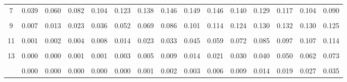\documentclass[
]{article}
\begin{document}
\begin{table}[!h]
{\begin{tabular}[t]{ccccccccccccccc}
7 & 0.039 & 0.060 & 0.082 & 0.104 & 0.123 & 0.138 & 0.146 & 0.149 & 0.146 & 0.140 & 0.129 & 0.117 & 0.104 & 0.090\\
\cellcolor{gray!10}{8} & \cellcolor{gray!10}{0.017} & \cellcolor{gray!10}{0.030} & \cellcolor{gray!10}{0.046} & \cellcolor{gray!10}{0.065} & \cellcolor{gray!10}{0.085} & \cellcolor{gray!10}{0.103} & \cellcolor{gray!10}{0.119} & \cellcolor{gray!10}{0.130} & \cellcolor{gray!10}{0.137} & \cellcolor{gray!10}{0.140} & \cellcolor{gray!10}{0.138} & \cellcolor{gray!10}{0.132} & \cellcolor{gray!10}{0.123} & \cellcolor{gray!10}{0.113}\\
9 & 0.007 & 0.013 & 0.023 & 0.036 & 0.052 & 0.069 & 0.086 & 0.101 & 0.114 & 0.124 & 0.130 & 0.132 & 0.130 & 0.125\\
\addlinespace
\cellcolor{gray!10}{10} & \cellcolor{gray!10}{0.002} & \cellcolor{gray!10}{0.005} & \cellcolor{gray!10}{0.010} & \cellcolor{gray!10}{0.018} & \cellcolor{gray!10}{0.029} & \cellcolor{gray!10}{0.041} & \cellcolor{gray!10}{0.056} & \cellcolor{gray!10}{0.071} & \cellcolor{gray!10}{0.086} & \cellcolor{gray!10}{0.099} & \cellcolor{gray!10}{0.110} & \cellcolor{gray!10}{0.119} & \cellcolor{gray!10}{0.124} & \cellcolor{gray!10}{0.125}\\
11 & 0.001 & 0.002 & 0.004 & 0.008 & 0.014 & 0.023 & 0.033 & 0.045 & 0.059 & 0.072 & 0.085 & 0.097 & 0.107 & 0.114\\
\cellcolor{gray!10}{12} & \cellcolor{gray!10}{0.000} & \cellcolor{gray!10}{0.001} & \cellcolor{gray!10}{0.002} & \cellcolor{gray!10}{0.003} & \cellcolor{gray!10}{0.007} & \cellcolor{gray!10}{0.011} & \cellcolor{gray!10}{0.018} & \cellcolor{gray!10}{0.026} & \cellcolor{gray!10}{0.037} & \cellcolor{gray!10}{0.048} & \cellcolor{gray!10}{0.060} & \cellcolor{gray!10}{0.073} & \cellcolor{gray!10}{0.084} & \cellcolor{gray!10}{0.095}\\
13 & 0.000 & 0.000 & 0.001 & 0.001 & 0.003 & 0.005 & 0.009 & 0.014 & 0.021 & 0.030 & 0.040 & 0.050 & 0.062 & 0.073\\
\cellcolor{gray!10}{14} & \cellcolor{gray!10}{0.000} & \cellcolor{gray!10}{0.000} & \cellcolor{gray!10}{0.000} & \cellcolor{gray!10}{0.000} & \cellcolor{gray!10}{0.001} & \cellcolor{gray!10}{0.002} & \cellcolor{gray!10}{0.004} & \cellcolor{gray!10}{0.007} & \cellcolor{gray!10}{0.011} & \cellcolor{gray!10}{0.017} & \cellcolor{gray!10}{0.024} & \cellcolor{gray!10}{0.032} & \cellcolor{gray!10}{0.042} & \cellcolor{gray!10}{0.052}\\
\addlinespace
15 & 0.000 & 0.000 & 0.000 & 0.000 & 0.000 & 0.001 & 0.002 & 0.003 & 0.006 & 0.009 & 0.014 & 0.019 & 0.027 & 0.035\\

\end{tabular}}
\end{table}
\end{document}
